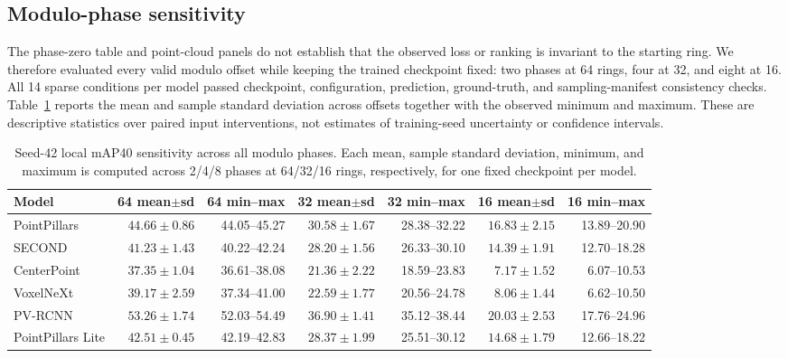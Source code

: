 \documentclass[10pt,twocolumn]{article}
\begin{document}
\FloatBarrier
\subsection{Modulo-phase sensitivity}
The phase-zero table and point-cloud panels do not establish that the observed loss or ranking is invariant to the starting ring. We therefore evaluated every valid modulo offset while keeping the trained checkpoint fixed: two phases at 64 rings, four at 32, and eight at 16. All 14 sparse conditions per model passed checkpoint, configuration, prediction, ground-truth, and sampling-manifest consistency checks. Table~\ref{tab:multiphase} reports the mean and sample standard deviation across offsets together with the observed minimum and maximum. These are descriptive statistics over paired input interventions, not estimates of training-seed uncertainty or confidence intervals.

\begin{table}[!tbp]
\centering\scriptsize
\caption{Seed-42 local mAP40 sensitivity across all modulo phases. Each mean, sample standard deviation, minimum, and maximum is computed across 2/4/8 phases at 64/32/16 rings, respectively, for one fixed checkpoint per model.}
\label{tab:multiphase}
\begin{adjustbox}{max width=\textwidth}\begin{tabular}{lrrrrrr}
\toprule
Model & 64 mean$\pm$sd & 64 min--max & 32 mean$\pm$sd & 32 min--max & 16 mean$\pm$sd & 16 min--max\\
\midrule
PointPillars & $44.66\pm0.86$ & 44.05--45.27 & $30.58\pm1.67$ & 28.38--32.22 & $16.83\pm2.15$ & 13.89--20.90\\
SECOND & $41.23\pm1.43$ & 40.22--42.24 & $28.20\pm1.56$ & 26.33--30.10 & $14.39\pm1.91$ & 12.70--18.28\\
CenterPoint & $37.35\pm1.04$ & 36.61--38.08 & $21.36\pm2.22$ & 18.59--23.83 & $7.17\pm1.52$ & 6.07--10.53\\
VoxelNeXt & $39.17\pm2.59$ & 37.34--41.00 & $22.59\pm1.77$ & 20.56--24.78 & $8.06\pm1.44$ & 6.62--10.50\\
PV-RCNN & $53.26\pm1.74$ & 52.03--54.49 & $36.90\pm1.41$ & 35.12--38.44 & $20.03\pm2.53$ & 17.76--24.96\\
PointPillars Lite & $42.51\pm0.45$ & 42.19--42.83 & $28.37\pm1.99$ & 25.51--30.12 & $14.68\pm1.79$ & 12.66--18.22\\
\bottomrule
\end{tabular}\end{adjustbox}
\end{table}
\end{document}
